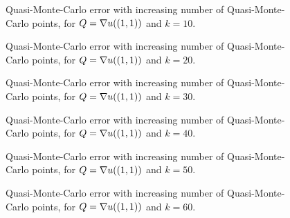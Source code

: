\begin{figure}[h]
    \centering
    
    \caption[Quasi-Monte-Carlo error, for $Q=\grad u((1,1))$ and $k=10$.]{Quasi-Monte-Carlo error with increasing number of Quasi-Monte-Carlo points, for $Q=\grad u((1,1))$ and $k=10$. \label{fig:qmcgradient_top_right10}}
  \end{figure}
\begin{figure}[h]
  \centering

\caption[Quasi-Monte-Carlo error, for $Q=\grad u((1,1))$ and $k=20$.]{Quasi-Monte-Carlo error with increasing number of Quasi-Monte-Carlo points, for $Q=\grad u((1,1))$ and $k=20$. \label{fig:qmcgradient_top_right20}}
\end{figure}
\begin{figure}[h]
    \centering
    
    \caption[Quasi-Monte-Carlo error, for $Q=\grad u((1,1))$ and $k=30$.]{Quasi-Monte-Carlo error with increasing number of Quasi-Monte-Carlo points, for $Q=\grad u((1,1))$ and $k=30$. \label{fig:qmcgradient_top_right30}}
  \end{figure}
\begin{figure}[h]
  \centering
  
\caption[Quasi-Monte-Carlo error, for $Q=\grad u((1,1))$ and $k=40$.]{Quasi-Monte-Carlo error with increasing number of Quasi-Monte-Carlo points, for $Q=\grad u((1,1))$ and $k=40$. \label{fig:qmcgradient_top_right0}}
\end{figure}
\begin{figure}[h]
    \centering
    
    \caption[Quasi-Monte-Carlo error, for $Q=\grad u((1,1))$ and $k=50$.]{Quasi-Monte-Carlo error with increasing number of Quasi-Monte-Carlo points, for $Q=\grad u((1,1))$ and $k=50$. \label{fig:qmcgradient_top_right50}}
  \end{figure}
\begin{figure}[h]
  \centering

\caption[Quasi-Monte-Carlo error, for $Q=\grad u((1,1))$ and $k=60$.]{Quasi-Monte-Carlo error with increasing number of Quasi-Monte-Carlo points, for $Q=\grad u((1,1))$ and $k=60$. \label{fig:qmcgradient_top_right60}}
\end{figure}

